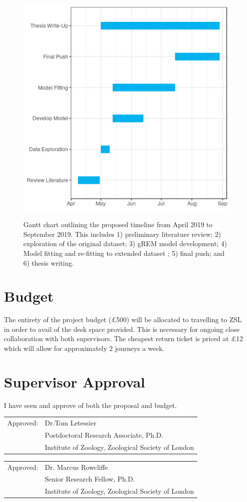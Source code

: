 \documentclass[11pt]{article}
\begin{document}
\begin{figure}[H]
	\includegraphics[height = 12cm, width=14cm]{../Data/gantt.png}
	\caption{Gantt chart outlining the proposed timeline from April 2019 to September 2019. This includes 1) preliminary literature review; 2) exploration of the original dataset; 3) gREM model development; 4) Model fitting and re-fitting to extended dataset ; 5) final push; and 6) thesis writing.}
\end{figure}

\section{Budget}
The entirety of the project budget (£500) will be allocated to travelling to ZSL in order to avail of the desk space provided. This is necessary for ongoing close collaboration with both supervisors.
The cheapest return ticket is priced at £12 which will allow for approximately 2 journeys a week.

\section{Supervisor Approval}
I have seen and approve of both the proposal and budget.\\

\begin{tabular}{@{}p{.5in}p{4in}@{}}
Approved: & Dr.Tom Letessier \\
& Postdoctoral Research Associate, Ph.D. \\
& Institute of Zoology, Zoological Society of London\\
\end{tabular}

\begin{tabular}{@{}p{.5in}p{4in}@{}}
Approved: & Dr. Marcus Rowcliffe \\
& Senior Research Fellow, Ph.D. \\
&  Institute of Zoology,  Zoological Society of London \\
\end{tabular}
 





\end{document}
